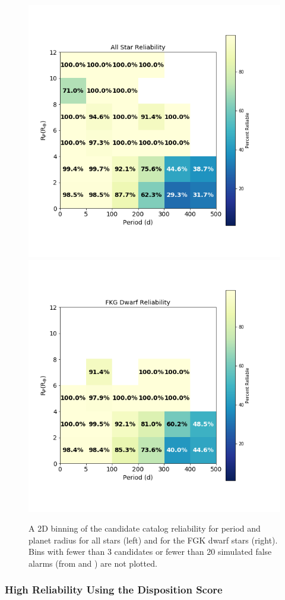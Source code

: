 \begin{figure}[ht]
\begin{center}
\includegraphics[width=0.45\linewidth]{fig-AllReliabilityPR.png}
\includegraphics[width=0.45\linewidth]{fig-FgkReliabilityPR.png}
\caption{A 2D binning of the candidate catalog reliability for period and planet radius for all stars (left) and for the FGK dwarf stars (right). Bins with fewer than 3 candidates or fewer than 20 simulated false alarms (from \invtce{} and \scrtce{}) are not plotted.}
\label{f:prReliability}
\end{center}
\end{figure}



\subsubsection{High Reliability Using the Disposition Score}
\label{s:crscores}

